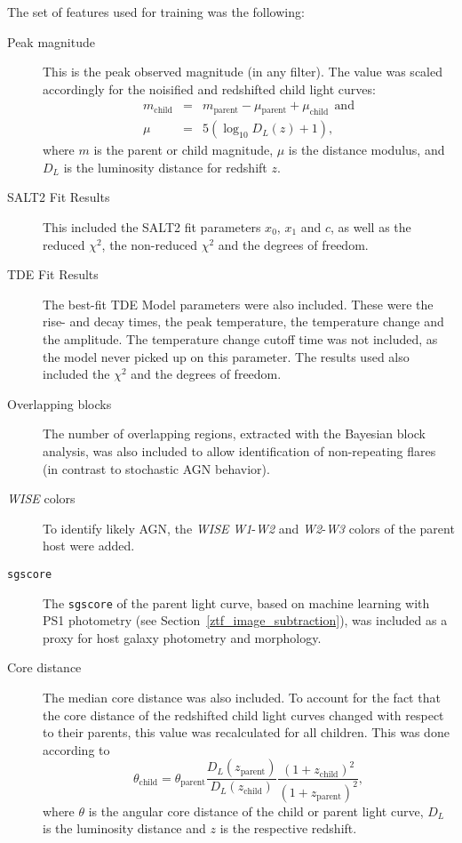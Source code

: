 The set of features used for training was the following:

\begin{description}
  \item[Peak magnitude] This is the peak observed magnitude (in any filter). The value was scaled accordingly for the noisified and redshifted child light curves:
        \begin{subequations}
          \begin{eqnarray}
            m_\text{child} &=& m_\text{parent} - \mu­_\text{parent} + \mu_\text{child}~~\text{and}\\
            \mu &=& 5(\log_{10}D_L(z)+1),
          \end{eqnarray}
        \end{subequations}
        where $m$ is the parent or child magnitude, $\mu$ is the distance modulus, and $D_L$ is the luminosity distance for redshift $z$.
  \item[SALT2 Fit Results] This included the SALT2 fit parameters $x_0$, $x_1$ and $c$, as well as the reduced $\chi^2$, the non-reduced $\chi^2$ and the degrees of freedom.
  \item[TDE Fit Results] The best-fit TDE Model parameters were also included. These were the rise- and decay times, the peak temperature, the temperature change and the amplitude. The temperature change cutoff time was not included, as the model never picked up on this parameter. The results used also included the $\chi^2$ and the degrees of freedom.
  \item[Overlapping blocks] The number of overlapping regions, extracted with the Bayesian block analysis, was also included to allow identification of non-repeating flares (in contrast to stochastic AGN behavior).
  \item[\textit{WISE} colors] To identify likely AGN, the \textit{WISE} \textit{W1}-\textit{W2} and \textit{W2}-\textit{W3} colors of the parent host were  added.
  \item[\texttt{sgscore}] The \texttt{sgscore} of the parent light curve, based on machine learning with PS1 photometry (see Section~\ref{ztf_image_subtraction}), was included as a proxy for host galaxy photometry and morphology.
  \item[Core distance] The median core distance was also included. To account for the fact that the core distance of the redshifted child light curves changed with respect to their parents, this value was recalculated for all children. This was done according to
        \begin{equation}
          \theta_\text{child} = \theta_\text{parent} \frac{D_L(z_\text{parent})}{D_L(z_\text{child})} \frac{(1+z_\text{child})^2}{(1+z_\text{parent})^2},
        \end{equation}
        where $\theta$ is the angular core distance of the child or parent light curve, $D_L$ is the luminosity distance and $z$ is the respective redshift.
\end{description}

